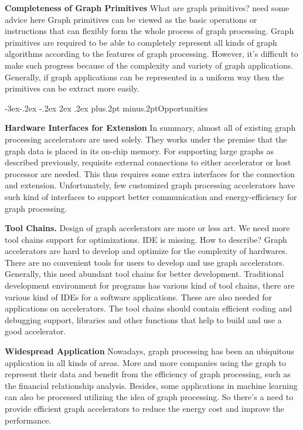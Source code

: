 \documentclass[twoside]{article}
\makeatletter
\def\subsection{\@startsection{subsection}{2}{\z@}%
 {-3ex\@plus -.2ex \@minus -.2ex}%
 {2ex \@plus.2ex}%
{\normalfont\normalsize\protect\baselineskip=12.5pt plus.2pt minus.2pt\bfseries}}
\makeatother
\begin{document}
\begin{multicols}{2}
\textbf{Completeness of Graph Primitives}
{\color{red}
What are graph primitives? need some advice here
}
Graph primitives can be viewed as the basic operations or instructions that can flexibly form the whole process of graph processing. Graph primitives are required to be able to completely represent all kinds of graph algorithms according to the features of graph processing. However, it's difficult to make such progress because of the complexity and variety of graph applications. Generally, if graph applications can be represented in a uniform way then the primitives can be extract more easily. 


\subsection{Opportunities}

\textbf{Hardware Interfaces for Extension} 
In summary, almost all of existing graph processing accelerators are used solely. They works under the premise that the graph data is placed in its on-chip memory. For supporting large graphs as described previously, requisite external connections to either accelerator or host processor are needed. This thus requires some extra interfaces for the connection and extension. Unfortunately, few customized graph processing accelerators have such kind of interfaces to support better communication and energy-efficiency for graph processing. 

\textbf{Tool Chains.}
{\color{red}
Design of graph accelerators are more or less art. We need more tool chains support for optimizations. IDE is missing. How to describe?
}
Graph accelerators are hard to develop and optimize for the complexity of hardwares. There are no convenient tools for users to develop and use graph accelerators. Generally, this need abundant tool chains for better development. Traditional development environment for programs has various kind of tool chains, there are various kind of IDEs for a software applications. These are also needed for applications on accelerators. The tool chains should contain efficient coding and debugging support, libraries and other functions that help to build and use a good accelerator.

\textbf{Widespread Application} 
Nowadays, graph processing has been an ubiquitous application in all kinds of areas. More and more companies using the graph to represent their data and benefit from the efficiency of graph processing, such as the financial relationship analysis. Besides, some applications in machine learning can also be processed utilizing the idea of graph processing. So there's a need to provide efficient graph accelerators to reduce the energy cost and improve the performance.


\end{multicols}
\end{document}
